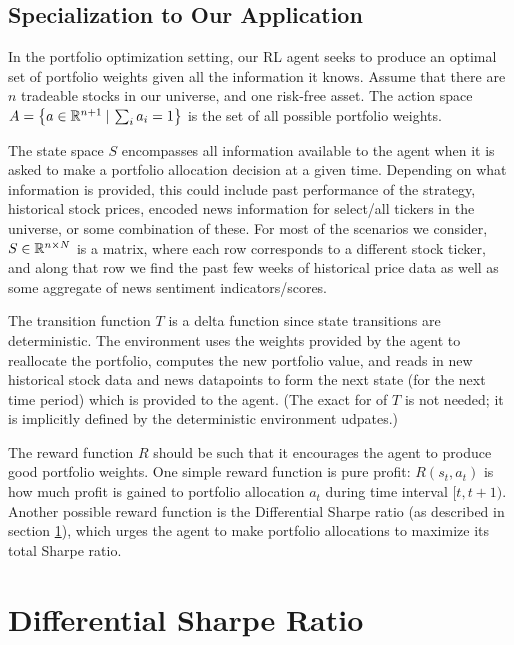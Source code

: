\subsection{Specialization to Our Application}

In the portfolio optimization setting, our RL agent seeks to produce an optimal set of portfolio weights given all the information it knows.
Assume that there are $n$ tradeable stocks in our universe, and one risk-free asset.
The action space $A = \left\{a \in \mathbb{R}^{n+1} \:|\: \sum_i a_i = 1\right\}$ is the set of all possible portfolio weights.

The state space $S$ encompasses all information available to the agent when it is asked to make a portfolio allocation decision at a given time.
Depending on what information is provided, this could include past performance of the strategy, historical stock prices, encoded news information for
select/all tickers in the universe, or some combination of these. For most of the scenarios we consider, $S \in \mathbb{R}^{n \times N}$ is a matrix, where
each row corresponds to a different stock ticker, and along that row we find the past few weeks of historical price data as well as some
aggregate of news sentiment indicators/scores.

The transition function $T$ is a delta function since state transitions are deterministic.
The environment uses the weights provided by the agent to reallocate the portfolio, computes the new portfolio value,
and reads in new historical stock data and news datapoints to form the next state (for the next time period) which is provided to the agent.
(The exact for of $T$ is not needed; it is implicitly defined by the deterministic environment udpates.)

The reward function $R$ should be such that it encourages the agent to produce good portfolio weights.
One simple reward function is pure profit: $R(s_t, a_t)$ is how much profit is gained to portfolio allocation $a_t$ during time interval $[t, t+1)$.
Another possible reward function is the Differential Sharpe ratio (as described in section \ref{diff_sharpe_ratio_section}), which urges the agent to make portfolio allocations to maximize its total Sharpe ratio. 



\section{Differential Sharpe Ratio}
\label{diff_sharpe_ratio_section}

